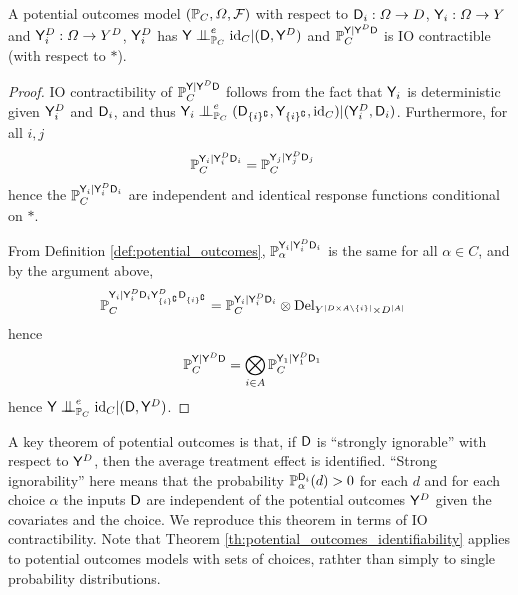 \begin{theorem}
A potential outcomes model $(\mathbb{P}_C,\Omega,\mathcal{F})$ with respect to $\mathsf{D}_i:\Omega\to D$, $\mathsf{Y}_i:\Omega\to Y$ and $\mathsf{Y}^D_i:\Omega\to Y^D$, $\mathsf{Y}^D_i$ has $\RV{Y}\CI_{\prob{P}_C}^e\text{id}_C|(\RV{D},\RV{Y}^D)$ and $\mathbb{P}_C^{\mathsf{Y}|\mathsf{Y}^D\mathsf{D}}$ is IO contractible (with respect to $*$).
\end{theorem}

\begin{proof}
IO contractibility of $\mathbb{P}_C^{\mathsf{Y}|\mathsf{Y}^D\mathsf{D}}$ follows from the fact that $\mathsf{Y}_i$ is deterministic given $\mathsf{Y}^D_i$ and $\mathsf{D}_i$, and thus $\RV{Y}_i\CI^e_{\prob{P}_C} (\RV{D}_{\{i\}^{\complement}},\RV{Y}_{\{i\}^{\complement}},\text{id}_C)|(\RV{Y}^D_{i},\RV{D}_i)$. Furthermore, for all $i,j$
\begin{align}
    \mathbb{P}_C^{\mathsf{Y}_i|\mathsf{Y}^D_i\mathsf{D}_i} &= \mathbb{P}_C^{\mathsf{Y}_j|\mathsf{Y}^D_j\mathsf{D}_j}
\end{align}
hence the $\mathbb{P}_C^{\mathsf{Y}_i|\mathsf{Y}^D_i\mathsf{D}_i}$ are independent and identical response functions conditional on $*$.

From Definition \ref{def:potential_outcomes}, $\mathbb{P}_\alpha^{\mathsf{Y}_i|\mathsf{Y}^D_i\mathsf{D}_i}$ is the same for all $\alpha\in C$, and by the argument above,
\begin{align}
    \mathbb{P}_C^{\mathsf{Y}_i|\mathsf{Y}^D_i\mathsf{D}_i\mathsf{Y}^D_{\{i\}^{\complement}}\mathsf{D}_{\{i\}^{\complement}}} &= \mathbb{P}_C^{\mathsf{Y}_i|\mathsf{Y}^D_i\mathsf{D}_i}\otimes \mathrm{Del}_{Y^{|D\times A\setminus\{i\}|}\times D^{|A|}}
\end{align}
hence
\begin{align}
    \mathbb{P}_C^{\mathsf{Y}|\mathsf{Y}^D\mathsf{D}} &= \bigotimes_{i\in A} \mathbb{P}_C^{\mathsf{Y}_1|\mathsf{Y}^D_1\mathsf{D}_1}
\end{align}
hence $\RV{Y}\CI_{\prob{P}_C}^e\text{id}_C|(\RV{D},\RV{Y}^D)$.
\end{proof}

A key theorem of potential outcomes is that, if $\mathsf{D}$ is ``strongly ignorable'' with respect to $\mathsf{Y}^D$, then the average treatment effect is identified. ``Strong ignorability'' here means that the probability $\mathbb{P}_\alpha^{\mathsf{D}_i}(d)>0$ for each $d$ and for each choice $\alpha$ the inputs $\mathsf{D}$ are independent of the potential outcomes $\mathsf{Y}^D$ given the covariates and the choice. We reproduce this theorem in terms of IO contractibility. Note that Theorem \ref{th:potential_outcomes_identifiability} applies to potential outcomes models with sets of choices, rathter than simply to single probability distributions.


